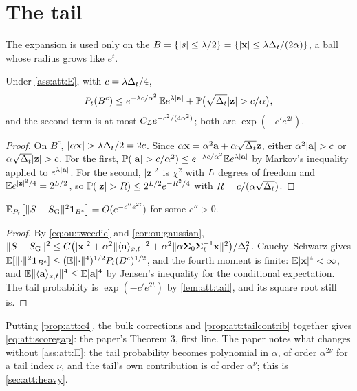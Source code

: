\section{The tail}
\label{sec:att:tail}

The expansion is used only on the  $B=\{|s|\le\lambda/2\}=\{|\mathbf{x}|\le\lambda\Delta_t/(2\alpha)\}$,
a ball whose radius grows like $e^{t}$.

\begin{lemma}
\label{lem:att:tail}
Under \cref{ass:att:E}, with $c=\lambda\Delta_t/4$,
\[
  \Pt(B^c)\le e^{-\lambda c/\alpha^2}\,\E e^{\lambda|\va|}+\Prob\bigl(\sqrt{\Dt}|\vz|>c/\alpha\bigr),
\]
and the second term is at most $C_{L}e^{-c^2/(4\alpha^2)}$; both are $\exp(-c'e^{2t})$.
\end{lemma}

\begin{proof}
On $B^c$, $|\alpha\vx|>\lambda\Dt/2=2c$. Since $\alpha\mathbf{x}=\alpha^2\mathbf{a}+\alpha\sqrt{\Delta_t}\mathbf{z}$,
either $\alpha^2|\va|>c$ or $\alpha\sqrt{\Dt}|\vz|>c$. For the first,
$\Prob(|\va|>c/\alpha^2)\le e^{-\lambda c/\alpha^2}\E e^{\lambda|\va|}$ by Markov's
inequality applied to $e^{\lambda|\mathbf{a}|}$. For the second, $|\mathbf{z}|^2$ is $\chi^2$ with
$L$ degrees of freedom and $\mathbb{E} e^{|\mathbf{z}|^2/4}=2^{L/2}$, so
$\Prob(|\vz|>R)\le2^{\nsites/2}e^{-R^2/4}$ with $R=c/(\alpha\sqrt{\Delta_t})$.
\end{proof}

\begin{proposition}
\label{prop:att:tailcontrib}
$\mathbb{E}_{P_t}\bigl[\lVert S-S_{\mathrm{G}}\rVert^2\mathbf 1_{B^c}\bigr]=O(e^{-c''e^{2t}})$ for
some $c''>0$.
\end{proposition}

\begin{proof}
By \cref{eq:ou:tweedie} and \cref{cor:ou:gaussian},
$\lVert S-S_{\mathrm{G}}\rVert^2\le C\bigl(|\mathbf{x}|^2+\alpha^2\lVert\langle \mathbf{a} \rangle_{x,t}\rVert^2+\alpha^2\lVert\alpha\mathbf{\Sigma}_0\mathbf{\Sigma}_t^{-1}\mathbf{x}\rVert^2\bigr)/\Delta_t^2$.
Cauchy--Schwarz gives $\mathbb{E}[\lVert\cdot\rVert^2\mathbf 1_{B^c}]\le(\mathbb{E}\lVert\cdot\rVert^4)^{1/2}P_t(B^c)^{1/2}$,
and the fourth moment is finite: $\mathbb{E}|\mathbf{x}|^4<\infty$, and
$\mathbb{E}\lVert\langle \mathbf{a} \rangle_{x,t}\rVert^4\le\mathbb{E}|\mathbf{a}|^4$ by Jensen's inequality for the conditional
expectation. The tail probability is $\exp(-c'e^{2t})$ by \cref{lem:att:tail}, and its
square root still is.
\end{proof}

Putting \cref{prop:att:c4}, the bulk corrections and \cref{prop:att:tailcontrib}
together gives \cref{eq:att:scoregap}: the paper's Theorem 3, first line. The paper
notes what changes without \cref{ass:att:E}: the tail probability becomes polynomial
in $\alpha$, of order $\alpha^{2\nu}$ for a tail index $\nu$, and the tail's own
contribution is of order $\alpha^\nu$; this is \cref{sec:att:heavy}.

